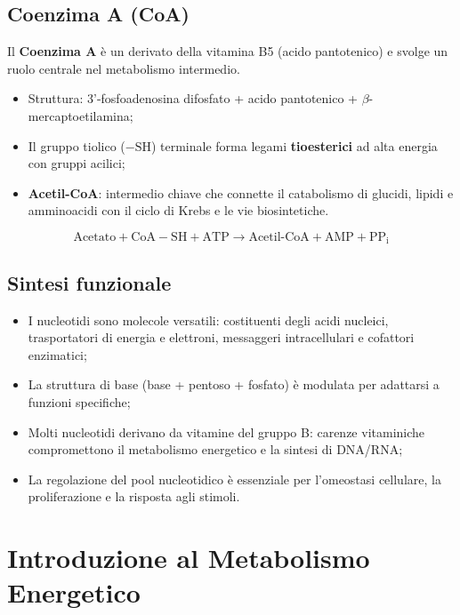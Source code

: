 \documentclass[12pt,a4paper]{report}
\begin{document}
\section{Coenzima A (CoA)}
Il \textbf{Coenzima A} è un derivato della vitamina B5 (acido pantotenico) e svolge un ruolo centrale nel metabolismo intermedio.
\begin{itemize}
\item Struttura: 3'-fosfoadenosina difosfato + acido pantotenico + $\beta$-mercaptoetilamina;
\item Il gruppo tiolico ($-\mathrm{SH}$) terminale forma legami \textbf{tioesterici} ad alta energia con gruppi acilici;
\item \textbf{Acetil-CoA}: intermedio chiave che connette il catabolismo di glucidi, lipidi e amminoacidi con il ciclo di Krebs e le vie biosintetiche.
\end{itemize}
\[
\text{Acetato} + \mathrm{CoA-SH} + \mathrm{ATP} \rightarrow \text{Acetil-CoA} + \mathrm{AMP} + \mathrm{PP_i}
\]

\section{Sintesi funzionale}
\begin{itemize}
\item I nucleotidi sono molecole versatili: costituenti degli acidi nucleici, trasportatori di energia e elettroni, messaggeri intracellulari e cofattori enzimatici;
\item La struttura di base (base + pentoso + fosfato) è modulata per adattarsi a funzioni specifiche;
\item Molti nucleotidi derivano da vitamine del gruppo B: carenze vitaminiche compromettono il metabolismo energetico e la sintesi di DNA/RNA;
\item La regolazione del pool nucleotidico è essenziale per l'omeostasi cellulare, la proliferazione e la risposta agli stimoli.
\end{itemize}

\chapter{Introduzione al Metabolismo Energetico}
\end{document}

